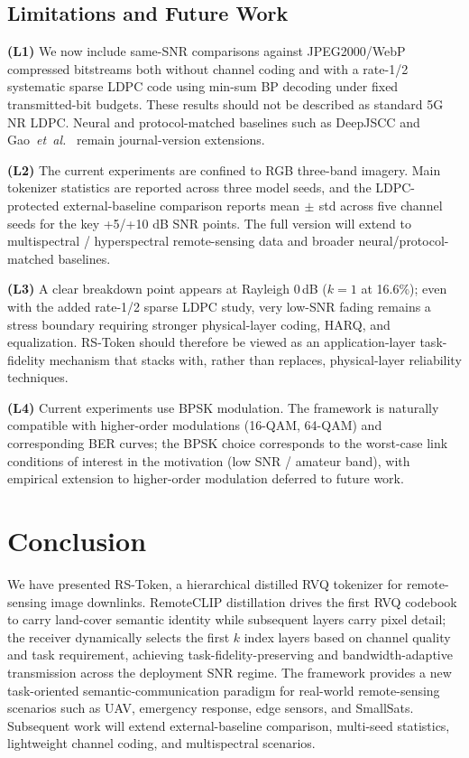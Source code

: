 \documentclass[lettersize,journal]{IEEEtran}
\begin{document}
\subsection{Limitations and Future Work}

\textbf{(L1)} We now include same-SNR comparisons against JPEG2000/WebP compressed bitstreams both without channel coding and with a rate-1/2 systematic sparse LDPC code using min-sum BP decoding under fixed transmitted-bit budgets. These results should not be described as standard 5G NR LDPC. Neural and protocol-matched baselines such as DeepJSCC and Gao~\textit{et~al.}~\cite{gao2022task} remain journal-version extensions.

\textbf{(L2)} The current experiments are confined to RGB three-band imagery. Main tokenizer statistics are reported across three model seeds, and the LDPC-protected external-baseline comparison reports mean$\,\pm\,$std across five channel seeds for the key +5/+10 dB SNR points. The full version will extend to multispectral / hyperspectral remote-sensing data and broader neural/protocol-matched baselines.

\textbf{(L3)} A clear breakdown point appears at Rayleigh 0\,dB ($k=1$ at 16.6\%); even with the added rate-1/2 sparse LDPC study, very low-SNR fading remains a stress boundary requiring stronger physical-layer coding, HARQ, and equalization. RS-Token should therefore be viewed as an application-layer task-fidelity mechanism that stacks with, rather than replaces, physical-layer reliability techniques.

\textbf{(L4)} Current experiments use BPSK modulation. The framework is naturally compatible with higher-order modulations (16-QAM, 64-QAM) and corresponding BER curves; the BPSK choice corresponds to the worst-case link conditions of interest in the motivation (low SNR / amateur band), with empirical extension to higher-order modulation deferred to future work.

\section{Conclusion}
We have presented RS-Token, a hierarchical distilled RVQ tokenizer for remote-sensing image downlinks. RemoteCLIP distillation drives the first RVQ codebook to carry land-cover semantic identity while subsequent layers carry pixel detail; the receiver dynamically selects the first $k$ index layers based on channel quality and task requirement, achieving task-fidelity-preserving and bandwidth-adaptive transmission across the deployment SNR regime. The framework provides a new task-oriented semantic-communication paradigm for real-world remote-sensing scenarios such as UAV, emergency response, edge sensors, and SmallSats. Subsequent work will extend external-baseline comparison, multi-seed statistics, lightweight channel coding, and multispectral scenarios.



\end{document}
